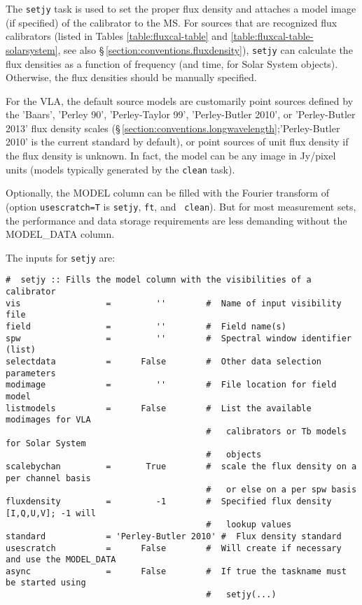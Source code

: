 The {\tt setjy} task is used to set the proper flux density and
attaches a model image (if specified) of the calibrator to the MS. For
sources that are recognized flux calibrators (listed in Tables
\ref{table:fluxcal-table} and \ref{table:fluxcal-table-solarsystem},
see also \S\,\ref{section:conventions.fluxdensity}),
{\tt setjy} can calculate the flux densities as a function of
frequency (and time, for Solar System objects).  Otherwise, the flux
densities should be manually specified.  

For the VLA, the default source models are customarily point sources
defined by the 'Baars', 'Perley 90', 'Perley-Taylor 99',
'Perley-Butler 2010', or 'Perley-Butler 2013' flux density scales
(\S\,\ref{section:conventions.longwavelength};'Perley-Butler 2010' is
the current standard by default), or point sources of unit flux
density if the flux density is unknown. In fact, the model can be any
image in Jy/pixel units (models typically generated by the {\tt clean}
task).


Optionally, the MODEL column can be filled with the Fourier transform
of (option {\tt usescratch=T} is {\tt setjy}, {\tt ft}, and {\tt
  clean}). But for most measurement sets, the performance and data
storage requirements are less demanding without the MODEL\_DATA column.

The inputs for {\tt setjy} are:
\small
\begin{verbatim}
#  setjy :: Fills the model column with the visibilities of a calibrator
vis                 =         ''        #  Name of input visibility file
field               =         ''        #  Field name(s)
spw                 =         ''        #  Spectral window identifier (list)
selectdata          =      False        #  Other data selection parameters
modimage            =         ''        #  File location for field model
listmodels          =      False        #  List the available modimages for VLA
                                        #   calibrators or Tb models for Solar System
                                        #   objects
scalebychan         =       True        #  scale the flux density on a per channel basis
                                        #   or else on a per spw basis
fluxdensity         =         -1        #  Specified flux density [I,Q,U,V]; -1 will
                                        #   lookup values
standard            = 'Perley-Butler 2010' #  Flux density standard
usescratch          =      False        #  Will create if necessary and use the MODEL_DATA
async               =      False        #  If true the taskname must be started using
                                        #   setjy(...)
\end{verbatim}
\normalsize 

